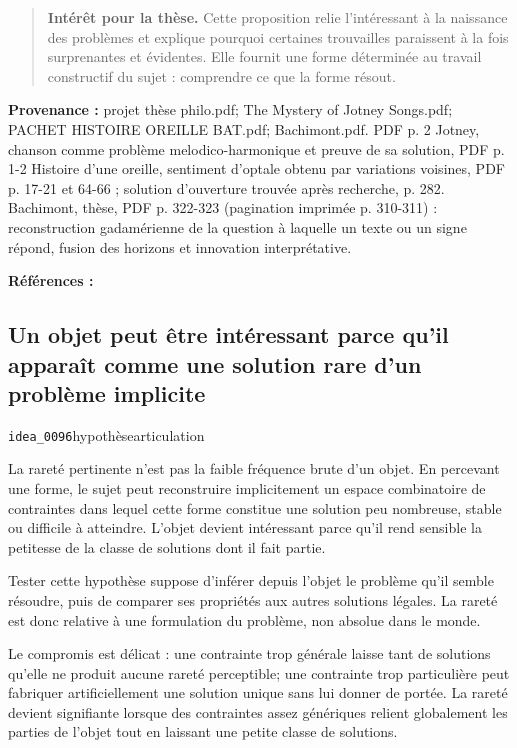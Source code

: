 \documentclass[10pt,a4paper]{article}
\begin{document}
\begin{quote}
\textbf{Intérêt pour la thèse.} Cette proposition relie l'intéressant à la naissance des problèmes et explique pourquoi certaines trouvailles paraissent à la fois surprenantes et évidentes. Elle fournit une forme déterminée au travail constructif du sujet : comprendre ce que la forme résout.
\end{quote}
{\footnotesize\color{metadata}\textbf{Provenance :} projet thèse philo.pdf; The Mystery of Jotney Songs.pdf; PACHET HISTOIRE OREILLE BAT.pdf; Bachimont.pdf. PDF p. 2 Jotney, chanson comme problème melodico-harmonique et preuve de sa solution, PDF p. 1-2 Histoire d'une oreille, sentiment d'optale obtenu par variations voisines, PDF p. 17-21 et 64-66 ; solution d'ouverture trouvée après recherche, p. 282. Bachimont, thèse, PDF p. 322-323 (pagination imprimée p. 310-311) : reconstruction gadamérienne de la question à laquelle un texte ou un signe répond, fusion des horizons et innovation interprétative.\par}
{\footnotesize\color{metadata}\textbf{Références :} \parencite{pachet2018oreille,bachimont1996hermeneutique}\par}

\subsection{Un objet peut être intéressant parce qu'il apparaît comme une solution rare d'un problème implicite}
{\small\color{metadata} \texttt{idea\_0096}\quad\textbullet\quad hypothèse\quad\textbullet\quad articulation\par}

La rareté pertinente n'est pas la faible fréquence brute d'un objet. En percevant une forme, le sujet peut reconstruire implicitement un espace combinatoire de contraintes dans lequel cette forme constitue une solution peu nombreuse, stable ou difficile à atteindre. L'objet devient intéressant parce qu'il rend sensible la petitesse de la classe de solutions dont il fait partie.

Tester cette hypothèse suppose d'inférer depuis l'objet le problème qu'il semble résoudre, puis de comparer ses propriétés aux autres solutions légales. La rareté est donc relative à une formulation du problème, non absolue dans le monde.

Le compromis est délicat : une contrainte trop générale laisse tant de solutions qu'elle ne produit aucune rareté perceptible; une contrainte trop particulière peut fabriquer artificiellement une solution unique sans lui donner de portée. La rareté devient signifiante lorsque des contraintes assez génériques relient globalement les parties de l'objet tout en laissant une petite classe de solutions.
\end{document}
